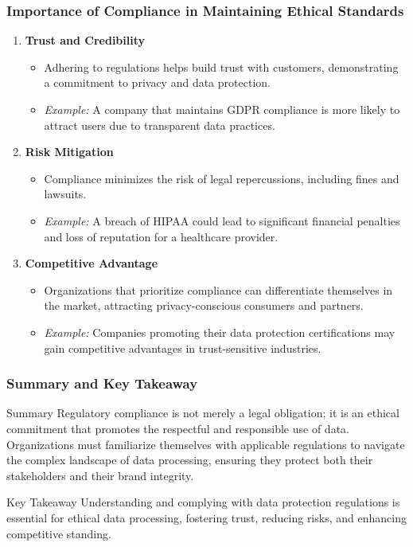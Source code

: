 \documentclass[aspectratio=169]{beamer}
\begin{document}
\begin{frame}[fragile]
    \frametitle{Importance of Compliance in Maintaining Ethical Standards}
    \begin{enumerate}
        \item \textbf{Trust and Credibility}
        \begin{itemize}
            \item Adhering to regulations helps build trust with customers, demonstrating a commitment to privacy and data protection.
            \item \textit{Example:} A company that maintains GDPR compliance is more likely to attract users due to transparent data practices.
        \end{itemize}
        
        \item \textbf{Risk Mitigation}
        \begin{itemize}
            \item Compliance minimizes the risk of legal repercussions, including fines and lawsuits.
            \item \textit{Example:} A breach of HIPAA could lead to significant financial penalties and loss of reputation for a healthcare provider.
        \end{itemize}

        \item \textbf{Competitive Advantage}
        \begin{itemize}
            \item Organizations that prioritize compliance can differentiate themselves in the market, attracting privacy-conscious consumers and partners.
            \item \textit{Example:} Companies promoting their data protection certifications may gain competitive advantages in trust-sensitive industries.
        \end{itemize}
    \end{enumerate}
\end{frame}

\begin{frame}[fragile]
    \frametitle{Summary and Key Takeaway}
    \begin{block}{Summary}
        Regulatory compliance is not merely a legal obligation; it is an ethical commitment that promotes the respectful and responsible use of data. Organizations must familiarize themselves with applicable regulations to navigate the complex landscape of data processing, ensuring they protect both their stakeholders and their brand integrity.
    \end{block}

    \begin{block}{Key Takeaway}
        Understanding and complying with data protection regulations is essential for ethical data processing, fostering trust, reducing risks, and enhancing competitive standing.
    \end{block}
\end{frame}
\end{document}

